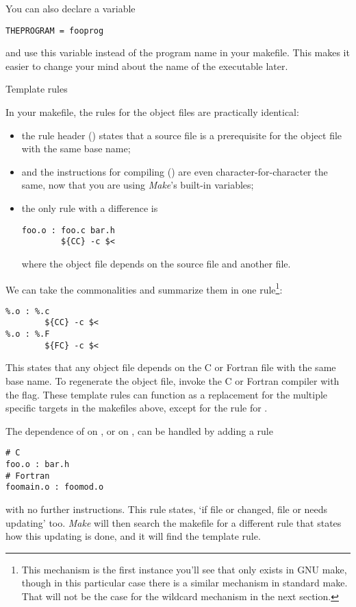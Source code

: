 You can also declare a variable
\begin{verbatim}
THEPROGRAM = fooprog
\end{verbatim}
and use this variable instead of the program name in your
makefile. This makes it easier to change your mind about the name of
the executable later. 

  {}

 {Template rules}

In your makefile, the rules for the object files are practically
identical:
\begin{itemize}
\item the rule header () states that a source file is a
  prerequisite for the object file with the same base name;
\item and the instructions for compiling () 
  are even character-for-character the
  same, now that you are using \emph{Make}'s built-in variables;
\item the only rule with a difference is 
\begin{verbatim}
foo.o : foo.c bar.h
        ${CC} -c $<
\end{verbatim}
  where the object file depends on the source file and another file.
\end{itemize}
We can take the commonalities and summarize them in one rule\footnote
{This mechanism is the first instance you'll see that only exists in
  GNU make, though in this particular case there is a similar
  mechanism in standard make. That will not be the case for the
  wildcard mechanism in the next section.}:
\begin{verbatim}
%.o : %.c
        ${CC} -c $<
%.o : %.F
        ${FC} -c $<
\end{verbatim}
This states that any object file depends on the C or Fortran file with
the same base name. To regenerate the object file, invoke the C or
Fortran compiler with the  flag.
These template rules can function as a replacement for the multiple
specific targets in the makefiles above, except for the rule for .

The dependence of  on , or  on
, can be handled by adding a rule
\begin{verbatim}
# C
foo.o : bar.h
# Fortran
foomain.o : foomod.o
\end{verbatim}
with no further instructions. This rule states, `if file
 or  changed, file  or 
needs updating' too. \emph{Make} will
then search the makefile for a different
rule that states how this updating is done, and it will find the
template rule.

